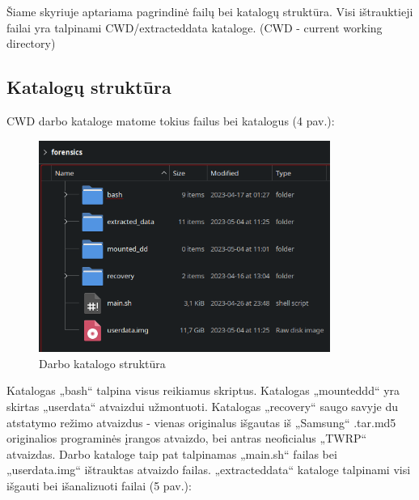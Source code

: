 \documentclass[a4paper,12pt,fleqn]{article}
\begin{document}
Šiame skyriuje aptariama pagrindinė failų bei katalogų struktūra. Visi ištrauktieji failai yra talpinami CWD/extracted\textunderscore data kataloge. (CWD - current working directory)

\subsection{Katalogų struktūra}
CWD darbo kataloge matome tokius failus bei katalogus (4 pav.): 
\begin{figure} [h]
    \centering
    \includegraphics[width=0.85\textwidth]{main_dir.png}
    \caption{Darbo katalogo struktūra}
    \label{fig:workdir}
\end{figure}

\newpage Katalogas „bash“ talpina visus reikiamus skriptus. Katalogas „mounted\textunderscore dd“ yra skirtas „userdata“ atvaizdui užmontuoti. Katalogas „recovery“ saugo savyje du atstatymo režimo atvaizdus - vienas originalus išgautas iš „Samsung“ .tar.md5 originalios programinės įrangos atvaizdo, bei antras neoficialus „TWRP“ atvaizdas. Darbo kataloge taip pat talpinamas „main.sh“ failas bei „userdata.img“ ištrauktas atvaizdo failas. „extracted\textunderscore data“ kataloge talpinami visi išgauti bei išanalizuoti failai (5 pav.): 
\end{document}
